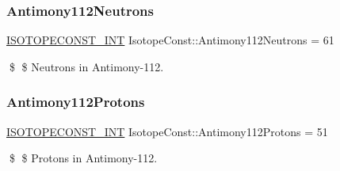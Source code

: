 \subsubsection{\texorpdfstring{Antimony112\+Neutrons}{Antimony112Neutrons}}
{\footnotesize\ttfamily \mbox{\hyperlink{group___isotope_const-_macros_ga5f18360b3e99483a35c32d789e62621c}{I\+S\+O\+T\+O\+P\+E\+C\+O\+N\+S\+T\+\_\+\+I\+NT}} Isotope\+Const\+::\+Antimony112\+Neutrons = 61}

\$ \$ Neutrons in Antimony-\/112. \mbox{\label{group___isotope_const-_antimony-_sb112_gaf4ce1e22ad41f3583f9e4f03a2811568}} 
\subsubsection{\texorpdfstring{Antimony112\+Protons}{Antimony112Protons}}
{\footnotesize\ttfamily \mbox{\hyperlink{group___isotope_const-_macros_ga5f18360b3e99483a35c32d789e62621c}{I\+S\+O\+T\+O\+P\+E\+C\+O\+N\+S\+T\+\_\+\+I\+NT}} Isotope\+Const\+::\+Antimony112\+Protons = 51}

\$ \$ Protons in Antimony-\/112. 